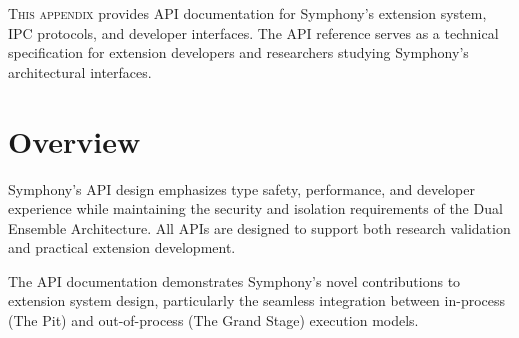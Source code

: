\label{app:api-reference}

\vspace{0.3cm}


\lettrine{T}{his appendix} provides API documentation for Symphony's extension system, IPC protocols, and developer interfaces. The API reference serves as a technical specification for extension developers and researchers studying Symphony's architectural interfaces.

\vspace{0.2cm}
\section*{Overview}

Symphony's API design emphasizes type safety, performance, and developer experience while maintaining the security and isolation requirements of the Dual Ensemble Architecture. All APIs are designed to support both research validation and practical extension development.

The API documentation demonstrates Symphony's novel contributions to extension system design, particularly the seamless integration between in-process (The Pit) and out-of-process (The Grand Stage) execution models.





